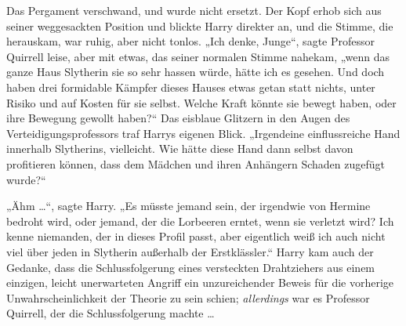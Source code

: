 Das Pergament verschwand, und wurde nicht ersetzt. Der Kopf erhob sich aus seiner weggesackten Position und blickte Harry direkter an, und die Stimme, die herauskam, war ruhig, aber nicht tonlos.
„Ich denke, Junge“, sagte Professor Quirrell leise, aber mit etwas, das seiner normalen Stimme nahekam, „wenn das ganze Haus Slytherin sie so sehr hassen würde, hätte ich es gesehen. Und doch haben drei formidable Kämpfer dieses Hauses etwas getan statt nichts, unter Risiko und auf Kosten für sie selbst. Welche Kraft könnte sie bewegt haben, oder ihre Bewegung gewollt haben?“ Das eisblaue Glitzern in den Augen des Verteidigungsprofessors traf Harrys eigenen Blick.
„Irgendeine einflussreiche Hand innerhalb Slytherins, vielleicht. Wie hätte diese Hand dann selbst davon profitieren können, dass dem Mädchen und ihren Anhängern Schaden zugefügt wurde?“

„Ähm …“, sagte Harry.
„Es müsste jemand sein, der irgendwie von Hermine bedroht wird, oder jemand, der die Lorbeeren erntet, wenn sie verletzt wird? Ich kenne niemanden, der in dieses Profil passt, aber eigentlich weiß ich auch nicht viel über jeden in Slytherin außerhalb der Erstklässler.“ Harry kam auch der Gedanke, dass die Schlussfolgerung eines versteckten Drahtziehers aus einem einzigen, leicht unerwarteten Angriff ein unzureichender Beweis für die vorherige Unwahrscheinlichkeit der Theorie zu sein schien; \emph{allerdings} war es Professor Quirrell, der die Schlussfolgerung machte …

